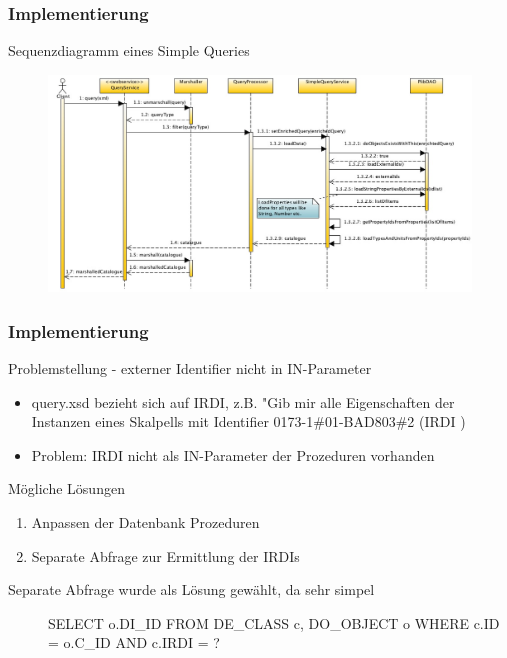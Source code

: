 \documentclass[serif,mathserif]{beamer}
\begin{document}
\begin{frame}
  \frametitle{Implementierung}
  Sequenzdiagramm eines Simple Queries
    \begin{figure}[t]
    \includegraphics[width=11.5cm]{images/plib_simple_query_sequence_diagram.jpg}

  \end{figure}
\end{frame}


\begin{frame}
  \frametitle{Implementierung}
  Problemstellung - externer Identifier nicht in IN-Parameter
  \begin{itemize}
  \item query.xsd bezieht sich auf IRDI, z.B. "Gib mir alle Eigenschaften der Instanzen eines Skalpells mit Identifier 0173-1\#01-BAD803\#2  (IRDI )
  \item Problem: IRDI nicht als IN-Parameter der Prozeduren vorhanden
  \end{itemize}
  
  Mögliche Lösungen
   \begin{enumerate}
  \item Anpassen der Datenbank Prozeduren
  \item Separate Abfrage zur Ermittlung der IRDIs
  \end{enumerate}
  
  \begin{description}
\item[Separate Abfrage wurde als Lösung gewählt, da sehr simpel] SELECT o.DI\_ID FROM DE\_CLASS c, DO\_OBJECT o WHERE c.ID = o.C\_ID AND c.IRDI = ? 
\end{description}

\end{frame}
\end{document}
